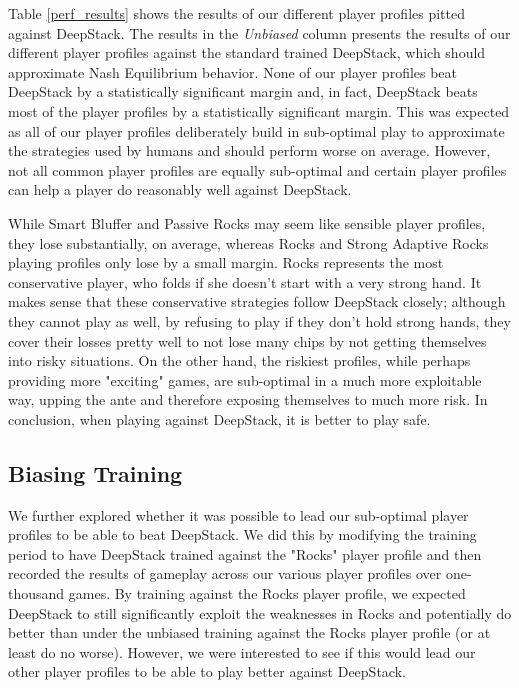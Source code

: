 \documentclass{article}
\begin{document}
\indent Table \ref{perf_results} shows the results of our different player profiles pitted against DeepStack. %
The results in the \textit{Unbiased} column presents the results of our different player profiles against the standard trained DeepStack, which should approximate Nash Equilibrium behavior. None of our player profiles beat DeepStack by a statistically significant margin and, in fact, DeepStack beats most of the player profiles by a statistically significant margin. This was expected as all of our player profiles deliberately build in sub-optimal play to approximate the strategies used by humans and should perform worse on average. However, not all common player profiles are equally sub-optimal and certain player profiles can help a player do reasonably well against DeepStack. 

\indent While Smart Bluffer and Passive Rocks may seem like sensible player profiles, they lose substantially, on average, whereas Rocks and Strong Adaptive Rocks playing profiles only lose by a small margin. Rocks represents the most conservative player, who folds if she doesn't start with a very strong hand. It makes sense that these conservative strategies follow DeepStack closely; although they cannot play as well, by refusing to play if they don't hold strong hands, they cover their losses pretty well to not lose many chips by not getting themselves into risky situations. On the other hand, the riskiest profiles, while perhaps providing more "exciting" games, are sub-optimal in a much more exploitable way, upping the ante and therefore exposing themselves to much more risk. In conclusion, when playing against DeepStack, it is better to play safe. %

\subsection{Biasing Training}

\indent We further explored whether it was possible to lead our sub-optimal player profiles to be able to beat DeepStack. We did this by modifying the training period to have DeepStack trained against the "Rocks" player profile and then recorded the results of gameplay across our various player profiles over one-thousand games. By training against the Rocks player profile, we expected DeepStack to still significantly exploit the weaknesses in Rocks and potentially do better than under the unbiased training against the Rocks player profile (or at least do no worse). However, we were interested to see if this would lead our other player profiles to be able to play better against DeepStack.
\end{document}
